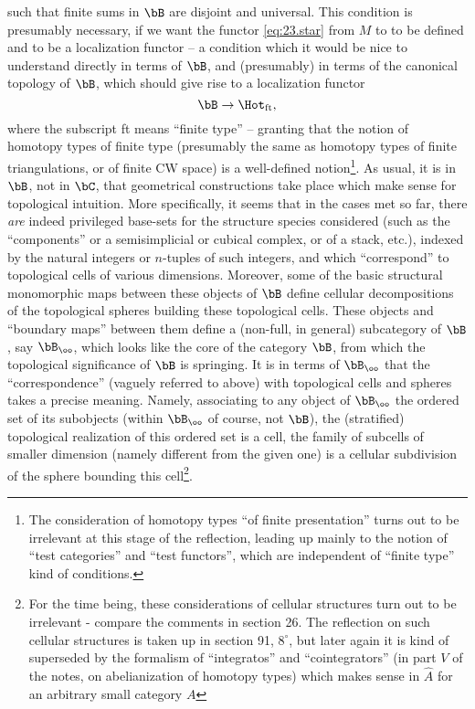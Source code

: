 such that finite sums in $\bB$ are disjoint and universal. This
condition is presumably necessary, if we want the functor
\eqref{eq:23.star} from $M$ to \Hot{} to be defined and to be a
localization functor -- a condition which it would be nice to
understand directly in terms of $\bB$, and
(presumably) in terms of the canonical topology of $\bB$, which
should give rise to a localization functor
\[ \bB \to \Hot_{\text{ft}}, \]
where the subscript ft means ``finite type'' -- granting that the
notion of homotopy types of finite type (presumably the same as
homotopy types of finite triangulations, or of finite CW space) is a
well-defined notion\footnote{The consideration of homotopy types ``of finite presentation'' turns out to be irrelevant at this stage of the reflection, leading up mainly to the notion of ``test categories'' and ``test functors'', which are independent of ``finite type'' kind of conditions.}. As usual, it is in $\bB$, not in $\bC$,
that geometrical constructions take place which make sense for
topological intuition. More specifically, it seems that in the cases
met so far, there \emph{are} indeed privileged base-sets for the
structure species considered (such as the ``components'' or a
semisimplicial or cubical complex, or of a stack, etc.), indexed by
the natural integers or $n$-tuples of such integers, and which
``correspond'' to topological cells of various dimensions. Moreover,
some of the basic structural monomorphic maps between these objects of
$\bB$ define cellular decompositions of the topological spheres
building these topological cells. These objects and ``boundary maps''
between them define a (non-full, in general) subcategory of $\bB$,
say $\bB_\oo$, which looks like the core of the category $\bB$,
from which the topological significance of $\bB$ is springing. It
is in terms of $\bB_\oo$ that the ``correspondence'' (vaguely
referred to above) with topological cells and spheres takes a precise
meaning. Namely, associating to any object of $\bB_\oo$ the ordered
set of its subobjects (within $\bB_\oo$ of course, not $\bB$),
the (stratified) topological realization of this ordered set is a
cell, the family of subcells of smaller dimension (namely different
from the given one) is a cellular subdivision of the sphere bounding
this cell\footnote{For the time being, these considerations of cellular structures turn out to be irrelevant - compare the comments in section 26. The reflection on such cellular structures is taken up in section 91, $8^\circ$, but later again it is kind of superseded by the formalism of ``integratos'' and ``cointegrators'' (in part $V$ of the notes, on abelianization of homotopy types) which makes sense in $\hat{A}$ for an arbitrary small category $A$}.

